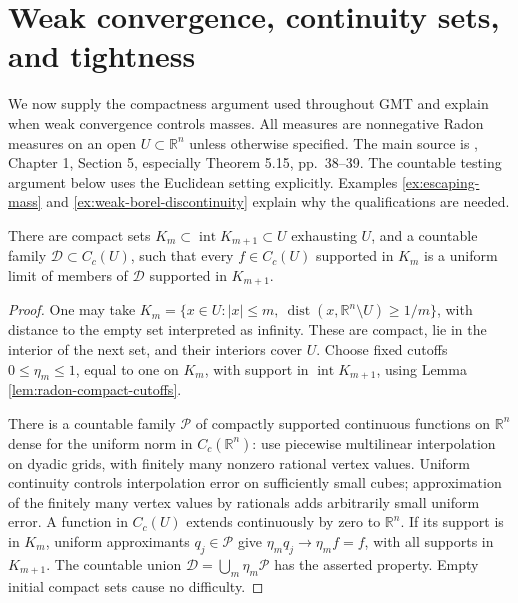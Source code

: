 \chapter{Weak convergence, continuity sets, and tightness}\label{sec:measure-convergence-tools}
We now supply the compactness argument used throughout GMT and explain when weak convergence controls masses. All measures are nonnegative Radon measures on an open $U\subset\mathbb R^n$ unless otherwise specified. The main source is \cite{Sim18}, Chapter 1, Section 5, especially Theorem 5.15, pp.~38--39. The countable testing argument below uses the Euclidean setting explicitly. Examples \ref{ex:escaping-mass} and \ref{ex:weak-borel-discontinuity} explain why the qualifications are needed.

\begin{lemma}\label{lem:countable-radon-tests}
There are compact sets $K_m\subset\operatorname{int}K_{m+1}\subset U$ exhausting $U$, and a countable family $\mathcal D\subset C_c(U)$, such that every $f\in C_c(U)$ supported in $K_m$ is a uniform limit of members of $\mathcal D$ supported in $K_{m+1}$.
\end{lemma}
\begin{proof}
One may take $K_m=\{x\in U:|x|\leq m,\ \operatorname{dist}(x,\mathbb R^n\setminus U)\geq1/m\}$, with distance to the empty set interpreted as infinity. These are compact, lie in the interior of the next set, and their interiors cover $U$. Choose fixed cutoffs $0\leq\eta_m\leq1$, equal to one on $K_m$, with support in $\operatorname{int}K_{m+1}$, using Lemma \ref{lem:radon-compact-cutoffs}.

There is a countable family $\mathcal P$ of compactly supported continuous functions on $\mathbb R^n$ dense for the uniform norm in $C_c(\mathbb R^n)$: use piecewise multilinear interpolation on dyadic grids, with finitely many nonzero rational vertex values. Uniform continuity controls interpolation error on sufficiently small cubes; approximation of the finitely many vertex values by rationals adds arbitrarily small uniform error. A function in $C_c(U)$ extends continuously by zero to $\mathbb R^n$. If its support is in $K_m$, uniform approximants $q_j\in\mathcal P$ give $\eta_mq_j\to\eta_mf=f$, with all supports in $K_{m+1}$. The countable union $\mathcal D=\bigcup_m\eta_m\mathcal P$ has the asserted property. Empty initial compact sets cause no difficulty.
\end{proof}

